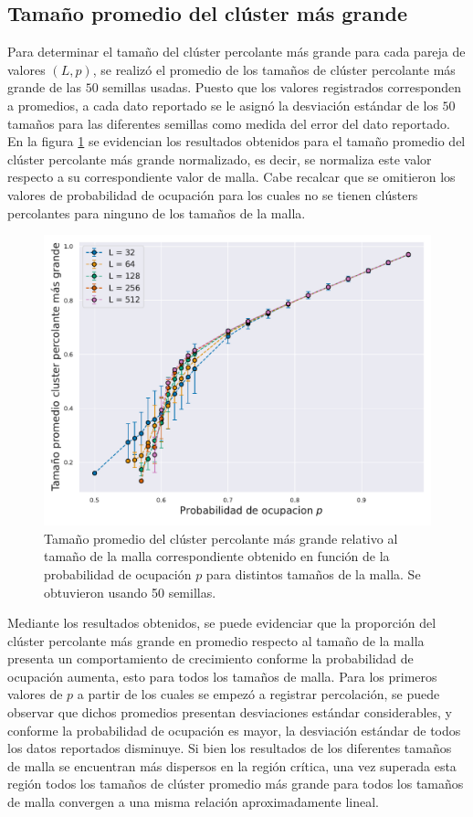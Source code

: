 \documentclass[%
 reprint,
 amsmath,amssymb,
 aps,
]{revtex4-2}
\begin{document}
\subsection{Tamaño promedio del clúster más grande}

Para determinar el tamaño del clúster percolante más grande para cada pareja de valores $(L, p)$, se realizó el promedio de los tamaños de clúster percolante más grande de las $50$ semillas usadas. Puesto que los valores registrados corresponden a promedios, a cada dato reportado se le asignó la desviación estándar de los $50$ tamaños para las diferentes semillas como medida del error del dato reportado. En la figura \ref{fig: tamano} se evidencian los resultados obtenidos para el tamaño promedio del clúster percolante más grande normalizado, es decir, se normaliza este valor respecto a su correspondiente valor de malla. Cabe recalcar que se omitieron los valores de probabilidad de ocupación para los cuales no se tienen clústers percolantes para ninguno de los tamaños de la malla.

\begin{figure}[H]
    \centering
    \includegraphics[width=1\linewidth]{Tamanocluster.pdf}
    \caption{Tamaño promedio del clúster percolante más grande relativo al tamaño de la malla correspondiente obtenido en función de la probabilidad de ocupación $p$ para distintos tamaños de la malla. Se obtuvieron usando 50 semillas.}
    \label{fig: tamano}
\end{figure}

Mediante los resultados obtenidos, se puede evidenciar que la proporción del clúster percolante más grande en promedio respecto al tamaño de la malla presenta un comportamiento de crecimiento conforme la probabilidad de ocupación aumenta, esto para todos los tamaños de malla. Para los primeros valores de $p$ a partir de los cuales se empezó a registrar percolación, se puede observar que dichos promedios presentan desviaciones estándar considerables, y conforme la probabilidad de ocupación es mayor, la desviación estándar de todos los datos reportados disminuye. Si bien los resultados de los diferentes tamaños de malla se encuentran más dispersos en la región crítica, una vez superada esta región todos los tamaños de clúster promedio más grande para todos los tamaños de malla convergen a una misma relación aproximadamente lineal. 
\end{document}
